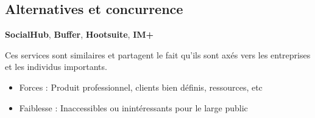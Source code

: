 \documentclass[11pt]{article}
\begin{document}
%
%


\subsection{Alternatives et concurrence}


\textbf{SocialHub}, \textbf{Buffer}, \textbf{Hootsuite}, \textbf{IM+}

Ces services sont similaires et partagent le fait qu'ils sont axés vers les entreprises et les individus importants.
\begin{itemize}
	\item Forces : Produit professionnel, clients bien définis, ressources, etc
	
	\item Faiblesse : Inaccessibles ou inintéressants pour le large public
\end{itemize}
\end{document}
